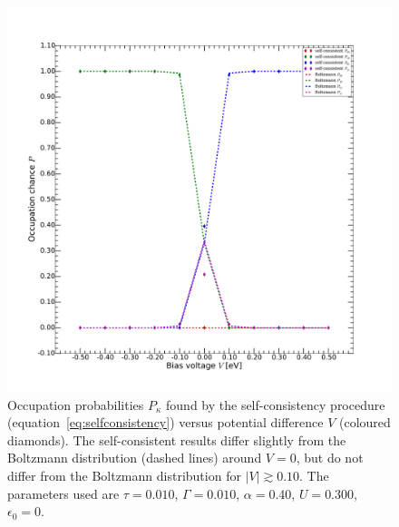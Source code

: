 \begin{figure}[p]
    \centering
    \includegraphics[width=.95\textwidth]{pdf/selfconsistent_low_temperature_1.pdf}
    \caption{Occupation probabilities $P_{\kappa}$ found by the self-consistency procedure (equation~\ref{eq:selfconsistency}) versus potential difference $V$ (coloured diamonds). The self-consistent results differ slightly from the Boltzmann distribution (dashed lines) around $V=0$, but do not differ from the Boltzmann distribution for $\left|V\right|\gtrsim 0.10$. The parameters used are $\tau=0.010$, $\Gamma=0.010$, $\alpha=0.40$, $U=0.300$, $\epsilon_0=0$. }
    \label{fig:occprob}
\end{figure} \clearpage


